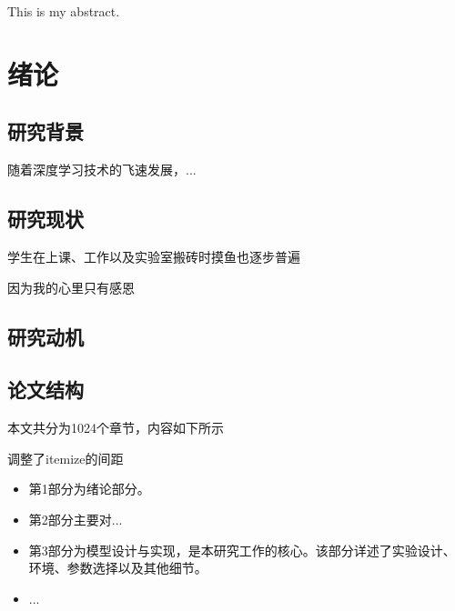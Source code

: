 \documentclass{ecnuthesis}
\begin{document}
\frontmatter

\begin{abstract}
  这是我的摘要
\end{abstract}

\begin{abstractEN}
  
 This is my abstract.
\end{abstractEN}

\mainmatter

\chapter{绪论}
\section{研究背景}
随着深度学习技术的飞速发展，...

\section{研究现状}

学生在上课、工作以及实验室搬砖时摸鱼也逐步普遍


因为我的心里只有感恩

\section{研究动机}


\section{论文结构}
本文共分为1024个章节，内容如下所示

调整了itemize的间距
\begin{itemize}
    \item 第1部分为绪论部分。
    \item 第2部分主要对...
    \item 第3部分为模型设计与实现，是本研究工作的核心。该部分详述了实验设计、环境、参数选择以及其他细节。
    \item ...
\end{itemize}
\end{document}
